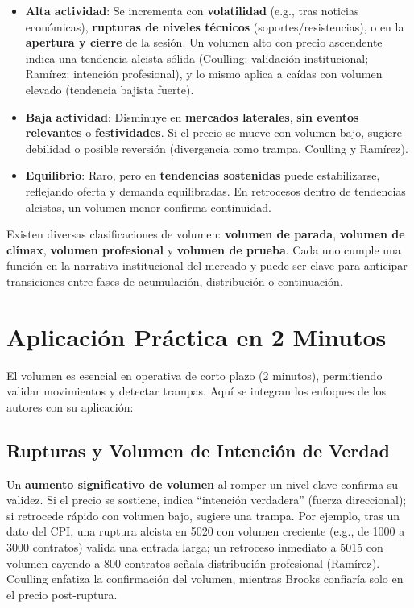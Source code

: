 \begin{itemize}
    \item \textbf{Alta actividad}: Se incrementa con \textbf{volatilidad} (e.g., tras noticias econ\'omicas), \textbf{rupturas de niveles t\'ecnicos} (soportes/resistencias), o en la \textbf{apertura y cierre} de la sesi\'on. Un volumen alto con precio ascendente indica una tendencia alcista s\'olida (Coulling: validaci\'on institucional; Ram\'irez: intenci\'on profesional), y lo mismo aplica a ca\'idas con volumen elevado (tendencia bajista fuerte).
    \item \textbf{Baja actividad}: Disminuye en \textbf{mercados laterales}, \textbf{sin eventos relevantes} o \textbf{festividades}. Si el precio se mueve con volumen bajo, sugiere debilidad o posible reversi\'on (divergencia como trampa, Coulling y Ram\'irez).
    \item \textbf{Equilibrio}: Raro, pero en \textbf{tendencias sostenidas} puede estabilizarse, reflejando oferta y demanda equilibradas. En retrocesos dentro de tendencias alcistas, un volumen menor confirma continuidad.
\end{itemize}

Existen diversas clasificaciones de volumen: \textbf{volumen de parada}, \textbf{volumen de cl\'imax}, \textbf{volumen profesional} y \textbf{volumen de prueba}. Cada uno cumple una funci\'on en la narrativa institucional del mercado y puede ser clave para anticipar transiciones entre fases de acumulaci\'on, distribuci\'on o continuaci\'on.

\section{Aplicaci\'on Pr\'actica en 2 Minutos}

El volumen es esencial en operativa de corto plazo (2 minutos), permitiendo validar movimientos y detectar trampas. Aqu\'i se integran los enfoques de los autores con su aplicaci\'on:

\subsection{Rupturas y Volumen de Intenci\'on de Verdad}
Un \textbf{aumento significativo de volumen} al romper un nivel clave confirma su validez. Si el precio se sostiene, indica ``intenci\'on verdadera'' (fuerza direccional); si retrocede r\'apido con volumen bajo, sugiere una trampa. Por ejemplo, tras un dato del CPI, una ruptura alcista en 5020 con volumen creciente (e.g., de 1000 a 3000 contratos) valida una entrada larga; un retroceso inmediato a 5015 con volumen cayendo a 800 contratos se\~nala distribuci\'on profesional (Ram\'irez). Coulling enfatiza la confirmaci\'on del volumen, mientras Brooks confiar\'ia solo en el precio post-ruptura.

